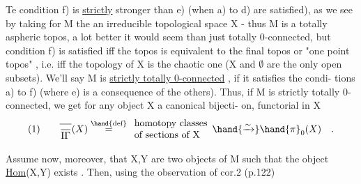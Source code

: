 Te condition f)  is \uline{strictly} stronger than e) (when a) to d) are
satisfied),  as we see by taking for M the 
  an irreducible topological space X
-  thus M is a totally aspheric topos,  a lot better it would seem than
just totally 0-connected,  but condition f) is satisfied iff the topos is
equivalent to  the final topos or "one point topos" ,  i.e. iff the
topology of X is the chaotic one (X and $\emptyset$  are the only open subsets).
We'll say M is \uline{strictly totally 0-connected} ,  if it satisfies the condi-%
tions a) to f) (where e) is a consequence of the others).  Thus,  if M is
strictly totally 0-connected,  we get for any object X a canonical bijecti-%
on,  functorial in X
\[ (1) \qquad \overline{\over{\mathrm I}{\Gamma}}(X) \overset{\hand{\text{def}}}{=} \begin{array}{l}\text{homotopy classes}\\ \text{of sections of X}\end{array} \hand{\xrightarrow{\sim}} \hand{\pi}_{0}(X) \quad . \]

Assume now,  moreover,  that X,Y are two objects of M such that
the object \uline{Hom}(X,Y)  exists . Then,  using the observation of cor.2 (p.122)
